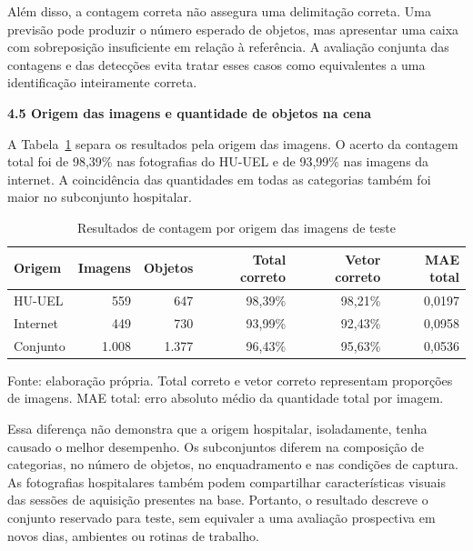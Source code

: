 Além disso, a contagem correta não assegura uma delimitação correta. Uma previsão pode produzir o número esperado de objetos, mas apresentar uma caixa com sobreposição insuficiente em relação à referência. A avaliação conjunta das contagens e das detecções evita tratar esses casos como equivalentes a uma identificação inteiramente correta.

\vspace{\baselineskip}
{}
\noindent\textbf{4.5 Origem das imagens e quantidade de objetos na cena}\par
\nobreak\vspace{\baselineskip}\nobreak

A Tabela~\ref{tab:res-origem} separa os resultados pela origem das imagens. O acerto da contagem total foi de 98,39\% nas fotografias do HU-UEL e de 93,99\% nas imagens da internet. A coincidência das quantidades em todas as categorias também foi maior no subconjunto hospitalar.

\begin{table}[htbp]
\centering
\caption{Resultados de contagem por origem das imagens de teste}
\label{tab:res-origem}
\begin{minipage}{\linewidth}\small\singlespacing\centering
\begin{tabular}{p{2.3cm}rrrrr}
\hline
Origem & Imagens & Objetos & Total correto & Vetor correto & MAE total \\
\hline
HU-UEL & 559 & 647 & 98,39\% & 98,21\% & 0,0197 \\
Internet & 449 & 730 & 93,99\% & 92,43\% & 0,0958 \\
Conjunto & 1.008 & 1.377 & 96,43\% & 95,63\% & 0,0536 \\
\hline
\end{tabular}
\par\smallskip\raggedright\footnotesize Fonte: elaboração própria. Total correto e vetor correto representam proporções de imagens. MAE total: erro absoluto médio da quantidade total por imagem.
\end{minipage}
\end{table}

Essa diferença não demonstra que a origem hospitalar, isoladamente, tenha causado o melhor desempenho. Os subconjuntos diferem na composição de categorias, no número de objetos, no enquadramento e nas condições de captura. As fotografias hospitalares também podem compartilhar características visuais das sessões de aquisição presentes na base. Portanto, o resultado descreve o conjunto reservado para teste, sem equivaler a uma avaliação prospectiva em novos dias, ambientes ou rotinas de trabalho.

